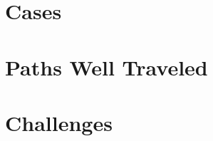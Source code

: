 \documentclass{beamer}
\begin{document}
\section{Cases}
\begin{comment}
* Cases
** Case study: Scientific Computing (we know this target exists)
*** Target user: a senior physics major who knows some C, and wants to either 1) contribute to a project or 2) do some research and feed it back into a community
*** Write wiki articles instead of writing a paper.
*** http://www.scipy.org/Getting_Started
*** http://www.opensourcephysics.org/
**** Extend with projects that run on the EC2 compute cloud / GPGPUs
*** Automation of experiments / Arduino
\end{comment}

\section{Paths Well Traveled}
\begin{comment}
* existing programmes and opportunities
** GSOC
** Creative Commons uni program
** Wikipedia Prof Program
** TOS (sorta) / POSSE? (maybe)
\end{comment}

\section{Challenges}
\begin{comment}
* Challenges of doing open community stuff with students
** Some problems remaining to solve (for instance, IRC's interface sucks, community members don't always understand the "shoot self in foot" redirection need, hard to find projects, etc)
\end{comment}
\end{document}

